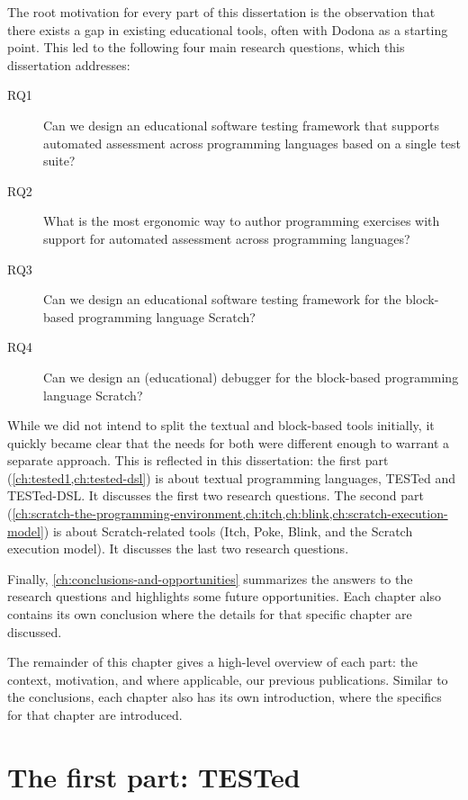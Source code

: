 \documentclass[../main]{subfiles}
\begin{document}
The root motivation for every part of this dissertation is the observation that there exists a gap in existing educational tools, often with Dodona as a starting point.
This led to the following four main research questions, which this dissertation addresses:

\begin{description}
    \item[RQ1] Can we design an educational software testing framework that supports automated assessment across programming languages based on a single test suite?
    \item[RQ2] What is the most ergonomic way to author programming exercises with support for automated assessment across programming languages?
    \item[RQ3] Can we design an educational software testing framework for the block-based programming language Scratch?
    \item[RQ4] Can we design an (educational) debugger for the block-based programming language Scratch?
\end{description}

While we did not intend to split the textual and block-based tools initially, it quickly became clear that the needs for both were different enough to warrant a separate approach.
This is reflected in this dissertation: the first part (\cref{ch:tested1,ch:tested-dsl}) is about textual programming languages, TESTed and TESTed-DSL\@.
It discusses the first two research questions.
The second part (\cref{ch:scratch-the-programming-environment,ch:itch,ch:blink,ch:scratch-execution-model}) is about Scratch-related tools (Itch, Poke, Blink, and the Scratch execution model).
It discusses the last two research questions.

Finally, \cref{ch:conclusions-and-opportunities} summarizes the answers to the research questions and highlights some future opportunities.
Each chapter also contains its own conclusion where the details for that specific chapter are discussed.

The remainder of this chapter gives a high-level overview of each part: the context, motivation, and where applicable, our previous publications.
Similar to the conclusions, each chapter also has its own introduction, where the specifics for that chapter are introduced.

\section{The first part: TESTed}\label{sec:intro-tested}
\end{document}
